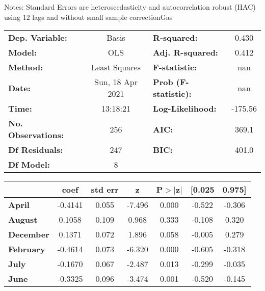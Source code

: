 Notes: \newline
 [1] Standard Errors are heteroscedasticity and autocorrelation robust (HAC) using 12 lags and without small sample correctionGas\begin{center}
\begin{tabular}{lclc}
\toprule
\textbf{Dep. Variable:}    &      Basis       & \textbf{  R-squared:         } &     0.430   \\
\textbf{Model:}            &       OLS        & \textbf{  Adj. R-squared:    } &     0.412   \\
\textbf{Method:}           &  Least Squares   & \textbf{  F-statistic:       } &       nan   \\
\textbf{Date:}             & Sun, 18 Apr 2021 & \textbf{  Prob (F-statistic):} &      nan    \\
\textbf{Time:}             &     13:18:21     & \textbf{  Log-Likelihood:    } &   -175.56   \\
\textbf{No. Observations:} &         256      & \textbf{  AIC:               } &     369.1   \\
\textbf{Df Residuals:}     &         247      & \textbf{  BIC:               } &     401.0   \\
\textbf{Df Model:}         &           8      & \textbf{                     } &             \\
\bottomrule
\end{tabular}
\begin{tabular}{lcccccc}
                  & \textbf{coef} & \textbf{std err} & \textbf{z} & \textbf{P$> |$z$|$} & \textbf{[0.025} & \textbf{0.975]}  \\
\midrule
\textbf{April}    &      -0.4141  &        0.055     &    -7.496  &         0.000        &       -0.522    &       -0.306     \\
\textbf{August}   &       0.1058  &        0.109     &     0.968  &         0.333        &       -0.108    &        0.320     \\
\textbf{December} &       0.1371  &        0.072     &     1.896  &         0.058        &       -0.005    &        0.279     \\
\textbf{February} &      -0.4614  &        0.073     &    -6.320  &         0.000        &       -0.605    &       -0.318     \\
\textbf{July}     &      -0.1670  &        0.067     &    -2.487  &         0.013        &       -0.299    &       -0.035     \\
\textbf{June}     &      -0.3325  &        0.096     &    -3.474  &         0.001        &       -0.520    &       -0.145     \\

\end{tabular}
\end{center}
